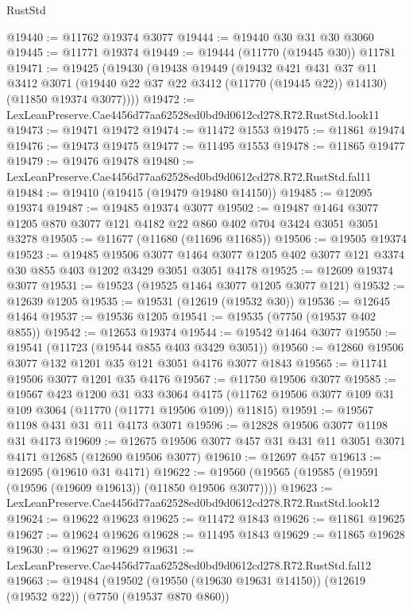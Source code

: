 \begin{lexlean}{RustStd}
\begin{coremodule}
@19440 := @11762 @19374 @3077
@19444 := @19440 @30 @31 @30 @3060
@19445 := @11771 @19374
@19449 := @19444 (@11770 (@19445 @30)) @11781
@19471 := @19425
    (@19430
      (@19438
        @19449
        (@19432
          @421
          @431
          @37
          @11
          @3412
          @3071
          (@19440 @22 @37 @22 @3412 (@11770 (@19445 @22)) @14130)
          (@11850 @19374 @3077))))
@19472 := LexLeanPreserve.Cae4456d77aa62528ed0bd9d0612cd278.R72.RustStd.look11
@19473 := @19471 @19472
@19474 := @11472 @1553
@19475 := @11861 @19474
@19476 := @19473 @19475
@19477 := @11495 @1553
@19478 := @11865 @19477
@19479 := @19476 @19478
@19480 := LexLeanPreserve.Cae4456d77aa62528ed0bd9d0612cd278.R72.RustStd.fal11
@19484 := @19410 (@19415 (@19479 @19480 @14150))
@19485 := @12095 @19374
@19487 := @19485 @19374 @3077
@19502 := @19487 @1464 @3077 @1205 @870 @3077 @121 @4182 @22 @860 @402 @704 @3424 @3051 @3051 @3278
@19505 := @11677 (@11680 (@11696 @11685))
@19506 := @19505 @19374
@19523 := @19485
    @19506
    @3077
    @1464
    @3077
    @1205
    @402
    @3077
    @121
    @3374
    @30
    @855
    @403
    @1202
    @3429
    @3051
    @3051
    @4178
@19525 := @12609 @19374 @3077
@19531 := @19523 (@19525 @1464 @3077 @1205 @3077 @121)
@19532 := @12639 @1205
@19535 := @19531 (@12619 (@19532 @30))
@19536 := @12645 @1464
@19537 := @19536 @1205
@19541 := @19535 (@7750 (@19537 @402 @855))
@19542 := @12653 @19374
@19544 := @19542 @1464 @3077
@19550 := @19541 (@11723 (@19544 @855 @403 @3429 @3051))
@19560 := @12860 @19506 @3077 @132 @1201 @35 @121 @3051 @4176 @3077 @1843
@19565 := @11741 @19506 @3077 @1201 @35 @4176
@19567 := @11750 @19506 @3077
@19585 := @19567
    @423
    @1200
    @31
    @33
    @3064
    @4175
    (@11762 @19506 @3077 @109 @31 @109 @3064 (@11770 (@11771 @19506 @109)) @11815)
@19591 := @19567 @1198 @431 @31 @11 @4173 @3071
@19596 := @12828 @19506 @3077 @1198 @31 @4173
@19609 := @12675 @19506 @3077 @457 @31 @431 @11 @3051 @3071 @4171 @12685 (@12690 @19506 @3077)
@19610 := @12697 @457
@19613 := @12695 (@19610 @31 @4171)
@19622 := @19560 (@19565 (@19585 (@19591 (@19596 (@19609 @19613)) (@11850 @19506 @3077))))
@19623 := LexLeanPreserve.Cae4456d77aa62528ed0bd9d0612cd278.R72.RustStd.look12
@19624 := @19622 @19623
@19625 := @11472 @1843
@19626 := @11861 @19625
@19627 := @19624 @19626
@19628 := @11495 @1843
@19629 := @11865 @19628
@19630 := @19627 @19629
@19631 := LexLeanPreserve.Cae4456d77aa62528ed0bd9d0612cd278.R72.RustStd.fal12
@19663 := @19484
    (@19502
      (@19550 (@19630 @19631 @14150))
      (@12619 (@19532 @22))
      (@7750 (@19537 @870 @860))

\end{coremodule}
\end{lexlean}
